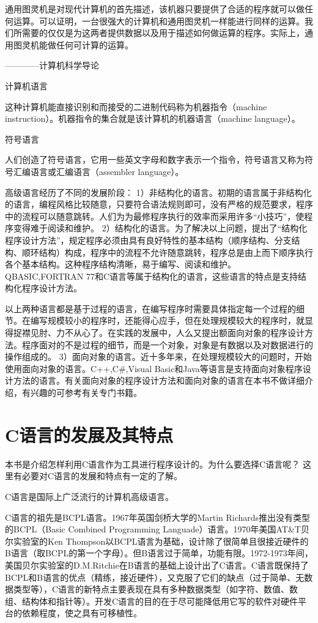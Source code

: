 通用图灵机是对现代计算机的首先描述，该机器只要提供了合适的程序就可以做任何运算。可以证明，一台很强大的计算机和通用图灵机一样能进行同样的运算。我们所需要的仅仅是为这两者提供数据以及用于描述如何做运算的程序。实际上，通用图灵机能做任何可计算的运算。

————计算机科学导论

计算机语言

这种计算机能直接识别和而接受的二进制代码称为机器指令（machine instruction）。机器指令的集合就是该计算机的机器语言（machine language）。

符号语言

人们创造了符号语言，它用一些英文字母和数字表示一个指令，符号语言又称为符号汇编语言或汇编语言（assembler language）。

高级语言经历了不同的发展阶段：
1）非结构化的语言。初期的语言属于非结构化的语言，编程风格比较随意，只要符合语法规则即可，没有严格的规范要求，程序中的流程可以随意跳转。人们为为最修程序执行的效率而采用许多“小技巧”，使程序变得难于阅读和维护。
2）结构化的语言。为了解决以上问题，提出了“结构化程序设计方法”，规定程序必须由具有良好特性的基本结构（顺序结构、分支结构、顺环结构）构成，程序中的流程不允许随意跳转，程序总是由上而下顺序执行各个基本结构。这种程序结构清晰，易于编写、阅读和维护。QBASIC,FORTRAN 77和C语言等属于结构化的语言，这些语言的特点是支持结构化程序设计方法。

以上两种语言都是基于过程的语言，在编写程序时需要具体指定每一个过程的细节。在编写规模较小的程序时，还能得心应手，但在处理规模较大的程序时，就显得捉襟见肘、力不从心了。在实践的发展中，人么又提出额面向对象的程序设计方法。程序面对的不是过程的细节，而是一个对象，对象是有数据以及对数据进行的操作组成的。
3）面向对象的语言。近十多年来，在处理规模较大的问题时，开始使用面向对象的语言。C++,C#,Visual Basic和Java等语言是支持面向对象程序设计方法的语言。有关面向对象的程序设计方法和面向对象的语言在本书不做详细介绍，有兴趣的可参考有关专门书籍。

\section{C语言的发展及其特点}

本书是介绍怎样利用C语言作为工具进行程序设计的。为什么要选择C语言呢？ 这里有必要对C语言的发展和特点有一定的了解。

C语言是国际上广泛流行的计算机高级语言。

C语言的祖先是BCPL语言。1967年英国剑桥大学的Martin Richards推出没有类型的BCPL（Basic Combined Programming Languade）语言。1970年美国AT&T贝尔实验室的Ken Thompson以BCPL语言为基础，设计除了很简单且很接近硬件的B语言（取BCPL的第一个字母）。但B语言过于简单，功能有限。1972-1973年间，美国贝尔实验室的D.M.Ritchie在B语言的基础上设计出了C语言。C语言既保持了BCPL和B语言的优点（精练，接近硬件），又克服了它们的缺点（过于简单、无数据类型等），C语言的新特点主要表现在具有多种数据类型（如字符、数值、数组、结构体和指针等）。开发C语言的目的在于尽可能降低用它写的软件对硬件平台的依赖程度，使之具有可移植性。

